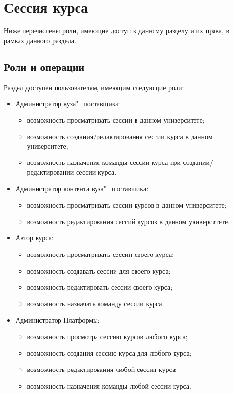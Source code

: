 \section{Сессия курса}

Ниже перечислены роли, имеющие доступ к данному разделу и их права,
в рамках данного раздела.

\subsection{Роли и операции}
Раздел доступен пользователям, имеющим следующие роли:
\begin{itemize}
	\item Администратор вуза"=поставщика:
	\begin{itemize}
		\item возможность просматривать сессии в данном университете;
		\item возможность создания/редактирования сессии курса в данном университете;
		\item возможность назначения команды сессии курса при создании/редактировании сессии курса.
	\end{itemize}
	\item Администратор контента вуза"=поставщика:
	\begin{itemize}
		\item возможность просматривать сессии курсов в данном университете;
		\item возможность редактирования сессий курсов в данном университете.
	\end{itemize}
	\item Автор курса:
	\begin{itemize}
		\item возможность просматривать сессии своего курса;
		\item возможность создавать сессии для своего курса;
		\item возможность редактировать сессии своего курса;
		\item возможность назначать команду сессии курса.
	\end{itemize}
	\item Администратор Платформы:
	\begin{itemize}
		\item возможность просмотра сессию курсов любого курса;
		\item возможность создания сессию курса для любого курса;
		\item возможность редактирования любой сессии курса;
		\item возможность назначения команды любой сессии курса.
	\end{itemize}
\end{itemize}
